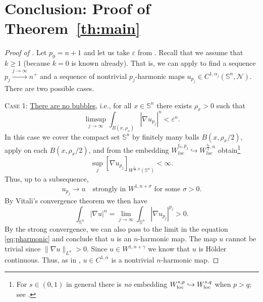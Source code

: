 \documentclass[12pt]{amsart}
\def\eps{\varepsilon}
\def\n{{\mathcal M}}
\def\n{{\mathcal{M}}}
\def\n{{\mathcal N}}
\def\S{{\mathbb S}}
\newcommand{\loc}{\mathrm{loc}}
\def\loc{{\rm loc}}
\numberwithin{theorem}{section} \numberwithin{equation}{section}
\begin{document}
\section{Conclusion: Proof of Theorem~\ref{th:main}}\label{s:main}



\begin{proof}[Proof of ]
Let $p_0=n+1$ and let us take $\eps$ from . Recall that we assume that $k \geq 1$ (because  $k=0$ is known already). That is, we can apply  to find a sequence $p_j \xrightarrow{j \to \infty} n^+$ and a sequence of nontrivial $p_j$-harmonic maps $u_{p_j} \in C^{1,\alpha_j}(\S^n,\n)$. There are two possible cases.

\textsc{Case 1:} \underline{There are no bubbles}, i.e., for all $x \in \S^n$ there exists $\rho_x > 0$ such that
 \[
  \limsup_{j \to \infty} \int_{B(x,\rho_x)} |\nabla u_{p_j}|^{n} < \eps^n.
 \]
In this case we cover the compact set $\S^n$ by finitely many balls $B(x,\rho_x/2)$, apply  on each $B(x,\rho_x/2)$,  and from the embedding $W^{t_0,p_j}_{loc} \hookrightarrow W^{\frac{t_0}{2},n}_{loc}$ obtain\footnote{For $s\in(0,1)$ in general there is \emph{no} embedding 
$W^{s,p}_{\loc}\hookrightarrow W^{s,q}_{\loc}$ when $p>q$; see \cite{Mironescu-Sickel}.}
\[
 \sup_j [\nabla u_{p_j}]_{ W^{\frac{t_0}{2},n}(\S^n)} < \infty.
\]
Thus, up to a subsequence, 
\[
 u_{p_j} \to u \quad \text {strongly in } W^{1,n+\sigma} \text{ for some $\sigma > 0$.}
\]
By Vitali's convergence theorem we then have 
\[
 \int_{\S^n} |\nabla u|^n = \lim_{j \to \infty} \int_{\S^n} |\nabla u_{p_j}|^{p_j} >0.
\]
By the strong convergence, we can also pass to the limit in the equation \eqref{eq:pharmonic} and conclude that $u$ is an $n$-harmonic map. The map $u$ cannot be trivial since $\|\nabla u\|_{L^n} > 0$. Since $u \in W^{1,n+\gamma}$ we know that $u$ is H\"{o}lder continuous. Thus, as in \cite[Section 3]{HLp}, $u \in C^{1,\alpha}$ is a nontrivial $n$-harmonic map.


\end{proof}
\end{document}

